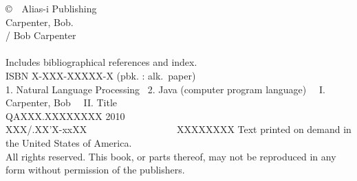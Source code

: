 \clearpage
\pagestyle{empty}
\vspace*{1.25in}
\noindent
{\footnotesize%
\copyright \ \ Alias-i Publishing
\hfill
\vfill
\vfill
{}
\\[6pt]
Carpenter, Bob.
\\
\hspace*{0.125in}{\it \bookname} / Bob Carpenter
\\
\hspace*{.5in}{p. cm.}
\\
\hspace*{0.125in}Includes bibliographical references and index.
\\
\hspace*{0.125in}ISBN X-XXX-XXXXX-X (pbk. : alk.~paper)
\\[4pt]
1. Natural Language Processing  \ 2. Java (computer program language) \ \ I. Carpenter, Bob \ \ II. Title
\\[2pt]
\hspace*{0.125in}QAXXX.XXXXXXXX 2010
\\[2pt]
\hspace*{0.125in}XXX/.XX'X-xxXX      \ \ \ \ \ \ \ \ \ \ \ \ \ \ \ \ \  \ XXXXXXXX
\vfill
\noindent
Text printed on demand in the United States of America.
\\[12pt]
All rights reserved. This book, or parts thereof, may not
be reproduced in any form without permission of the publishers.
}

